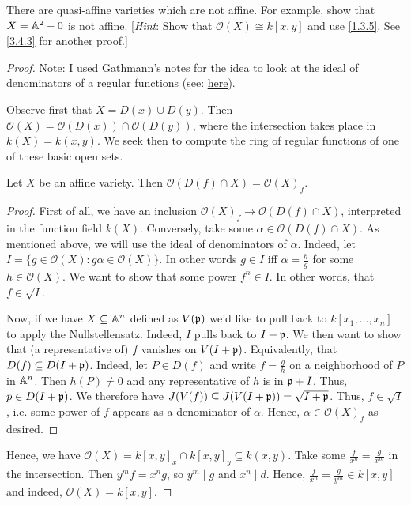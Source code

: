 \label{1.3.6}

There are quasi-affine varieties which are not affine. For example, show that $X = \mathbb A^2 - 0$ is not affine. [\emph{Hint}: Show that $\mathcal O(X) \cong k[x, y]$ and use \ref{1.3.5}. See \ref{3.4.3} for another proof.]

\begin{proof}
    Note: I used Gathmann's notes for the idea to look at the ideal of denominators of a regular functions (see: \href{http://www.mathematik.uni-kl.de/~gathmann/class/alggeom-2002/alggeom-2002.pdf}{here}).

    Observe first that $X = D(x) \cup D(y)$. Then $\mathcal O(X) = \mathcal O(D(x)) \cap \mathcal O(D(y))$, where the intersection takes place in $k(X) = k(x, y)$. We seek then to compute the ring of regular functions of one of these basic open sets.

    \begin{lemma}
        Let $X$ be an affine variety. Then $\mathcal O(D(f) \cap X) = \mathcal O(X)_f$.
    \end{lemma}
    \begin{proof}
        First of all, we have an inclusion $\mathcal O(X)_f \longrightarrow \mathcal O(D(f) \cap X)$, interpreted in the function field $k(X)$. Conversely, take some $\alpha \in \mathcal O(D(f) \cap X)$. As mentioned above, we will use the ideal of denominators of $\alpha$. Indeed, let $I = \{g \in \mathcal O(X) : g\alpha \in \mathcal O(X)\}$. In other words $g \in I$ iff $\alpha = \frac{h}{g}$ for some $h \in \mathcal O(X)$. We want to show that some power $f^n \in I$. In other words, that $f \in \sqrt{I}$.

        Now, if we have $X \subseteq \mathbb A^n$ defined as $V(\mathfrak p)$ we'd like to pull back to $k[x_1, \dots, x_n]$ to apply the Nullstellensatz. Indeed, $I$ pulls back to $I + \mathfrak p$. We then want to show that (a representative of) $f$ vanishes on $V(I + \mathfrak p)$. Equivalently, that $D(f) \subseteq D(I + \mathfrak p)$. Indeed, let $P \in D(f)$ and write $f = \frac{g}{h}$ on a neighborhood of $P$ in $\mathbb A^n$. Then $h(P) \neq 0$ and any representative of $h$ is in $\mathfrak p + I$. Thus, $p \in D(I + \mathfrak p)$. We therefore have $J(V(f)) \subseteq J(V(I + \mathfrak p)) = \sqrt{I + \mathfrak p}$. Thus, $f \in \sqrt{I}$, i.e. some power of $f$ appears as a denominator of $\alpha$. Hence, $\alpha \in \mathcal O(X)_f$ as desired.
    \end{proof}

    Hence, we have $\mathcal O(X) = k[x, y]_x \cap k[x, y]_y \subseteq k(x, y)$. Take some $\frac{f}{x^n} = \frac{g}{x^m}$ in the intersection. Then $y^m f = x^n g$, so $y^m \mid g$ and $x^n \mid d$. Hence, $\frac{f}{x^n} = \frac{g}{y^m} \in k[x, y]$ and indeed, $\mathcal O(X) = k[x, y]$.
\end{proof}
